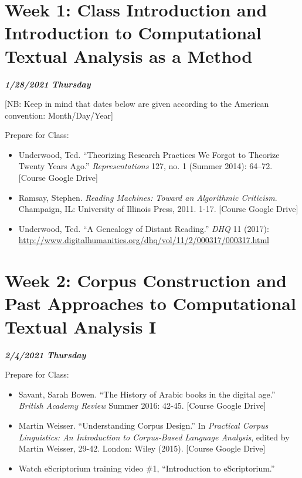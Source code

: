 \documentclass[
]{book}
\providecommand{\tightlist}{%
  \setlength{\itemsep}{0pt}\setlength{\parskip}{0pt}}
\begin{document}
\hypertarget{week-1-class-introduction-and-introduction-to-computational-textual-analysis-as-a-method-1}{%
\chapter{Week 1: Class Introduction and Introduction to Computational Textual Analysis as a Method}\label{week-1-class-introduction-and-introduction-to-computational-textual-analysis-as-a-method-1}}

\textbf{\emph{1/28/2021 Thursday}}

{[}NB: Keep in mind that dates below are given according to the American convention: Month/Day/Year{]}

Prepare for Class:

\begin{itemize}
\tightlist
\item
  Underwood, Ted. ``Theorizing Research Practices We Forgot to Theorize Twenty Years Ago.'' \emph{Representations} 127, no. 1 (Summer 2014): 64--72. {[}Course Google Drive{]}
\item
  Ramsay, Stephen. \emph{Reading Machines: Toward an Algorithmic Criticism}. Champaign, IL: University of Illinois Press, 2011. 1-17. {[}Course Google Drive{]}
\item
  Underwood, Ted. ``A Genealogy of Distant Reading.'' \emph{DHQ} 11 (2017): \url{http://www.digitalhumanities.org/dhq/vol/11/2/000317/000317.html}
\end{itemize}

\hypertarget{week-2-corpus-construction-and-past-approaches-to-computational-textual-analysis-i-1}{%
\chapter{Week 2: Corpus Construction and Past Approaches to Computational Textual Analysis I}\label{week-2-corpus-construction-and-past-approaches-to-computational-textual-analysis-i-1}}

\textbf{\emph{2/4/2021 Thursday}}

Prepare for Class:

\begin{itemize}
\tightlist
\item
  Savant, Sarah Bowen. ``The History of Arabic books in the digital age.'' \emph{British Academy Review} Summer 2016: 42-45. {[}Course Google Drive{]}
\item
  Martin Weisser. ``Understanding Corpus Design.'' In \emph{Practical Corpus Linguistics: An Introduction to Corpus‐Based Language Analysis}, edited by Martin Weisser, 29-42. London: Wiley (2015). {[}Course Google Drive{]}
\item
  Watch eScriptorium training video \#1, ``Introduction to eScriptorium.''
\end{itemize}
\end{document}
